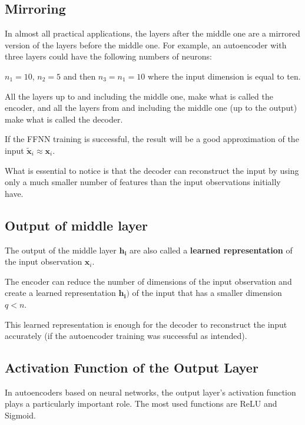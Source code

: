 \documentclass[%
oneside,                 %
final,                   %
10pt]{article}
\begin{document}
\vspace{6mm}

\subsection{Mirroring}

In almost all practical applications,
the layers after the middle one are a mirrored version of the layers before the middle one.
For example, an autoencoder with three layers could have the following numbers of neurons:

$n_{1} = 10$, $n_{2} = 5$ and then $n_{3} = n_{1} = 10$ where the input dimension is equal to ten.

All the layers up to and including the middle one, make what is called the encoder, and all the layers from and including
the middle one (up to the output) make what is called the decoder.

If the FFNN training is successful, the result will
be a good approximation of the input $\tilde{\mathbf{x}}_{i}\approx\mathbf{x}_{i}$.

What is essential to notice is that the decoder can reconstruct the
input by using only a much smaller number of features than the input
observations initially have.

\subsection{Output of middle layer}

The output of the middle layer
$\mathbf{h}_{\mathbf{i}}$ are also called a \textbf{learned representation} of the input observation $\mathbf{x}_{i}$.

The encoder can reduce the number of dimensions of the input
observation and create a learned representation
$\mathbf{h}_{\mathbf{i}}\mathbf{) }$ of the input that has a smaller
dimension $q<n$.

This learned representation is enough for the decoder to reconstruct
the input accurately (if the autoencoder training was successful as
intended).

\subsection{Activation Function of the Output Layer}

In autoencoders based on neural networks, the output layer's
activation function plays a particularly important role.  The most
used functions are ReLU and Sigmoid. 
\end{document}
